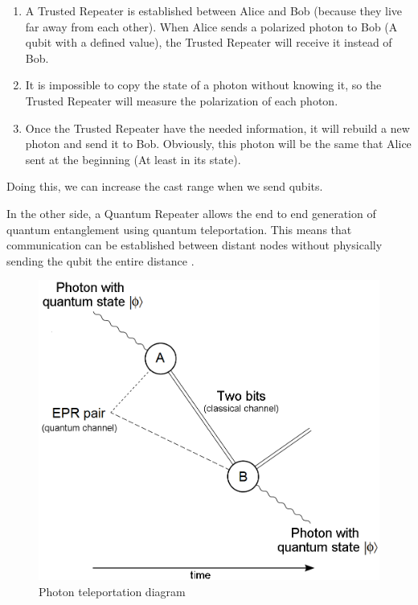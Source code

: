 \documentclass[12pt,journal]{journal}
\begin{document}
\begin{itemize}
\begin{enumerate}
\item A Trusted Repeater is established between Alice and Bob (because they live far away from each other). When Alice sends a polarized photon to Bob (A qubit with a defined value), the Trusted Repeater will receive it instead of Bob.

\item It is impossible to copy the state of a photon without knowing it, so the Trusted Repeater will measure the polarization of each photon. 

\item Once the Trusted Repeater have the needed information, it will rebuild a new photon and send it to Bob. Obviously, this photon will be the same that Alice sent at the beginning (At least in its state). 

\end{enumerate}

Doing this, we can increase the cast range when we send qubits. 

In the other side, a Quantum Repeater allows the end to end generation of quantum entanglement using quantum teleportation. This means that communication can be established between distant nodes without physically sending the qubit the entire distance \citep{bouwmeester1997experimental}.


\begin{figure}[tph!]
\centerline{\includegraphics[totalheight=6cm]{1}}
	\centering
    \caption{Photon teleportation diagram}
\end{figure}


\end{itemize}
\end{document}
